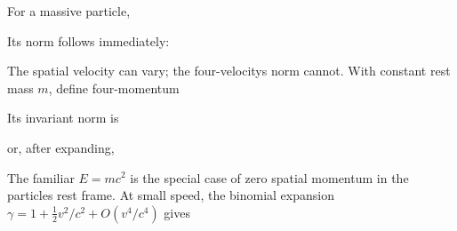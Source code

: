 \documentclass[
  11pt,
  letterpaper,
  oneside,
  openany]{scrbook}
\begin{document}
For a massive particle,

\begin{center}
\begingroup
{}
\ifdim\wd\grmathbox>\linewidth
\resizebox{\linewidth}{!}{\usebox{\grmathbox}}
\else\usebox{\grmathbox}\fi
\endgroup
\end{center}

Its norm follows immediately:

\begin{center}
\begingroup
{}
\ifdim\wd\grmathbox>\linewidth
\resizebox{\linewidth}{!}{\usebox{\grmathbox}}
\else\usebox{\grmathbox}\fi
\endgroup
\end{center}

The spatial velocity can vary; the four-velocity\textquotesingle s norm
cannot. With constant rest mass \(m\), define four-momentum

\begin{center}
\begingroup
{}
\ifdim\wd\grmathbox>\linewidth
\resizebox{\linewidth}{!}{\usebox{\grmathbox}}
\else\usebox{\grmathbox}\fi
\endgroup
\end{center}

Its invariant norm is

\begin{center}
\begingroup
{}
\ifdim\wd\grmathbox>\linewidth
\resizebox{\linewidth}{!}{\usebox{\grmathbox}}
\else\usebox{\grmathbox}\fi
\endgroup
\end{center}

or, after expanding,

\begin{center}
\begingroup
{}
\ifdim\wd\grmathbox>\linewidth
\resizebox{\linewidth}{!}{\usebox{\grmathbox}}
\else\usebox{\grmathbox}\fi
\endgroup
\end{center}

The familiar \(E=mc^2\) is the special case of zero spatial momentum in
the particle\textquotesingle s rest frame. At small speed, the binomial
expansion \(\gamma=1+\frac12v^2/c^2+O(v^4/c^4)\) gives
\end{document}
